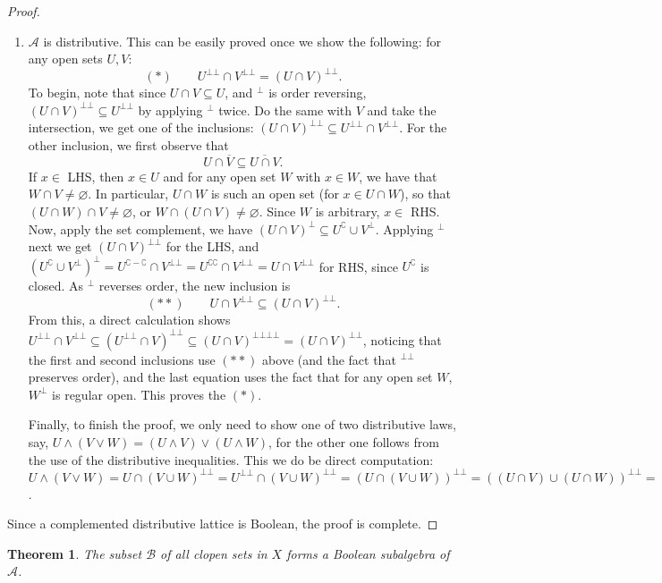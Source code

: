 \documentclass[12pt]{article}
\newtheorem{thm}{Theorem}
\begin{document}
\begin{proof}
\begin{enumerate}
\item $\mathcal{A}$ is distributive.  This can be easily proved once we show the following: for any open sets $U,V$: $$(*) \qquad U^{\bot\bot}\cap V^{\bot\bot}=(U\cap V)^{\bot\bot}.$$  To begin, note that since $U\cap V\subseteq U$, and $^\bot$ is order reversing, $(U\cap V)^{\bot\bot} \subseteq U^{\bot\bot}$ by applying $^\bot$ twice.  Do the same with $V$ and take the intersection, we get one of the inclusions: $(U\cap V)^{\bot\bot} \subseteq U^{\bot\bot}\cap V^{\bot\bot}$.  For the other inclusion, we first observe that $$U\cap \overline{V}\subseteq \overline{U\cap V}.$$  If $x\in$ LHS, then $x\in U$ and for any open set $W$ with $x\in W$, we have that $W\cap V\ne \varnothing$.  In particular, $U\cap W$ is such an open set (for $x\in U\cap W$), so that $(U\cap W)\cap V\ne \varnothing$, or $W\cap (U\cap V)\ne \varnothing$.  Since $W$ is arbitrary, $x\in$ RHS.  Now, apply the set complement, we have $(U\cap V)^\bot \subseteq U^\complement \cup V^\bot$.  Applying $^\bot$ next we get $(U\cap V)^{\bot\bot}$ for the LHS, and $(U^\complement \cup V^\bot)^\bot = U^{\complement-\complement}\cap V^{\bot\bot}=U^{\complement\complement}\cap V^{\bot\bot}=U\cap V^{\bot\bot}$ for RHS, since $U^\complement$ is closed.  As $^\bot$ reverses order, the new inclusion is $$(**) \qquad U\cap V^{\bot\bot}\subseteq (U\cap V)^{\bot \bot}.$$
From this, a direct calculation shows $U^{\bot\bot}\cap V^{\bot\bot} \subseteq (U^{\bot\bot} \cap V)^{\bot\bot} \subseteq (U \cap V)^{\bot\bot\bot\bot}=(U\cap V)^{\bot\bot}$, noticing that the first and second inclusions use $(**)$ above (and the fact that $^{\bot\bot}$ preserves order), and the last equation uses the fact that for any open set $W$, $W^\bot$ is regular open.  This proves the $(*)$.

Finally, to finish the proof, we only need to show one of two distributive laws, say, $U\wedge (V\vee W)=(U\wedge V)\vee (U\wedge W)$, for the other one follows from the use of the distributive inequalities.  This we do be direct computation: $U\wedge (V\vee W)=U \cap (V\cup W)^{\bot\bot} = U^{\bot\bot}\cap (V\cup W)^{\bot\bot}=(U\cap (V\cup W))^{\bot\bot}=((U\cap V)\cup (U\cap W))^{\bot\bot}=((U\wedge V)\cup (U\wedge W))^{\bot\bot}=(U\wedge V)\vee (U\wedge W)$.
\end{enumerate}
Since a complemented distributive lattice is Boolean, the proof is complete.
\end{proof}
\begin{thm} The subset $\mathcal{B}$ of all clopen sets in $X$ forms a Boolean subalgebra of $\mathcal{A}$. \end{thm}
\end{document}
